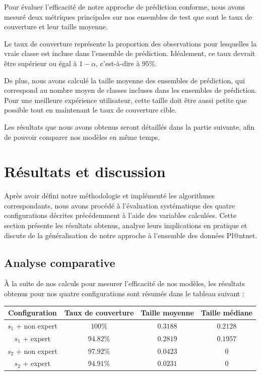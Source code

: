 \documentclass[a4paper,12pt]{article}
\begin{document}
Pour évaluer l'efficacité de notre approche de prédiction conforme, nous avons mesuré deux métriques principales sur nos ensembles de test que sont le taux de couverture et leur taille moyenne. 

\vspace{0.2cm}

Le taux de couverture représente la proportion des observations pour lesquelles la vraie classe est incluse dans l'ensemble de prédiction. Idéalement, ce taux devrait être supérieur ou égal à $1- \alpha$, c'est-à-dire à $95\%$.

\vspace{0.2cm}

De plus, nous avons calculé la taille moyenne des ensembles de prédiction, qui correspond au nombre moyen de classes incluses dans les ensembles de prédiction. Pour une meilleure expérience utilisateur, cette taille doit être aussi petite que possible tout en maintenant le taux de couverture cible.

\vspace{0.2cm}

Les résultats que nous avons obtenus seront détaillés dans la partie suivante, afin de pouvoir comparer nos modèles en même temps.

\section{Résultats et discussion}

Après avoir défini notre méthodologie et implémenté les algorithmes correspondants, nous avons procédé à l'évaluation systématique des quatre configurations décrites précédemment à l'aide des variables calculées. Cette section présente les résultats obtenus, analyse leurs implications en pratique et discute de la généralisation de notre approche à l'ensemble des données Pl@ntnet.

\subsection{Analyse comparative}

À la suite de nos calculs pour mesurer l'efficacité de nos modèles, les résultats obtenus pour nos quatre configurations sont résumés dans le tableau suivant :

\begin{center}
\begin{tabular}{|c|c|c|c|}
    \hline
    Configuration & Taux de couverture & Taille moyenne & Taille médiane \\
    \hline
    $s_1$ + non expert & $100\%$ & $0.3188$ & $0.2128$ \\
    $s_1$ + expert & $94.82\%$ & $0.2819$ & $0.1957$ \\
    $s_2$ + non expert & $97.92\%$ & $0.0423$ & $0$ \\
    $s_2$ + expert & $94.91\%$ & $0.0231$ & $0$ \\
    \hline
    \end{tabular}
\end{center}
    
\end{document}
